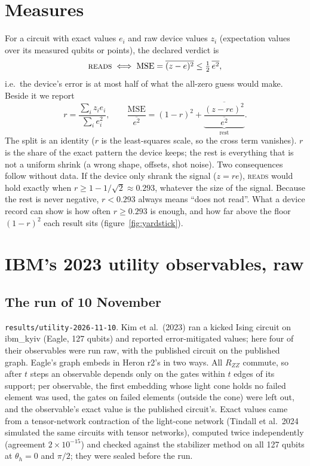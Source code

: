 \documentclass[10pt,a4paper]{article}
\begin{document}
\section{Measures}\label{sec:measures}
For a circuit with exact values $e_i$ and raw device values $z_i$ (expectation values over its measured qubits or
points), the declared verdict is
\[ \textsc{reads} \iff \mathrm{MSE} = \overline{(z-e)^2} \le \tfrac12\,\overline{e^2}, \]
i.e.\ the device's error is at most half of what the all-zero guess would make. Beside it we report
\[ r = \frac{\sum_i z_i e_i}{\sum_i e_i^2}, \qquad
   \frac{\mathrm{MSE}}{\overline{e^2}} = (1 - r)^2 + \underbrace{\frac{\overline{(z - r e)^2}}{\overline{e^2}}}_{\text{rest}}. \]
The split is an identity ($r$ is the least-squares scale, so the cross term vanishes). $r$ is the share of the exact
pattern the device keeps; the rest is everything that is not a uniform shrink (a wrong shape, offsets, shot noise).
Two consequences follow without data. If the device only shrank the signal ($z = re$), \textsc{reads} would hold exactly
when $r \ge 1 - 1/\sqrt2 \approx 0.293$, whatever the size of the signal. Because the rest is never negative,
$r < 0.293$ always means ``does not read''. What a device record can show is how often $r \ge 0.293$ is enough, and how
far above the floor $(1-r)^2$ each result sits (figure~\ref{fig:yardstick}).

\section{IBM's 2023 utility observables, raw}\label{sec:utility}
\subsection{The run of 10 November}
\texttt{results/utility-2026-11-10}. Kim et al.\ (2023) ran a kicked Ising circuit on ibm\_kyiv (Eagle, 127 qubits)
and reported error-mitigated values; here four of their observables were run raw, with the published circuit on the
published graph. Eagle's graph embeds in Heron r2's in two ways. All $R_{ZZ}$ commute, so after $t$ steps an
observable depends only on the gates within $t$ edges of its support; per observable, the first embedding whose light
cone holds no failed element was used, the gates on failed elements (outside the cone) were left out, and the
observable's exact value is the published circuit's. Exact values came from a tensor-network contraction of the
light-cone network (Tindall et al.\ 2024 simulated the same circuits with tensor networks), computed twice
independently (agreement $2\times10^{-15}$) and checked against the stabilizer
method on all 127 qubits at $\theta_h = 0$ and $\pi/2$; they were sealed before the run.
\end{document}
